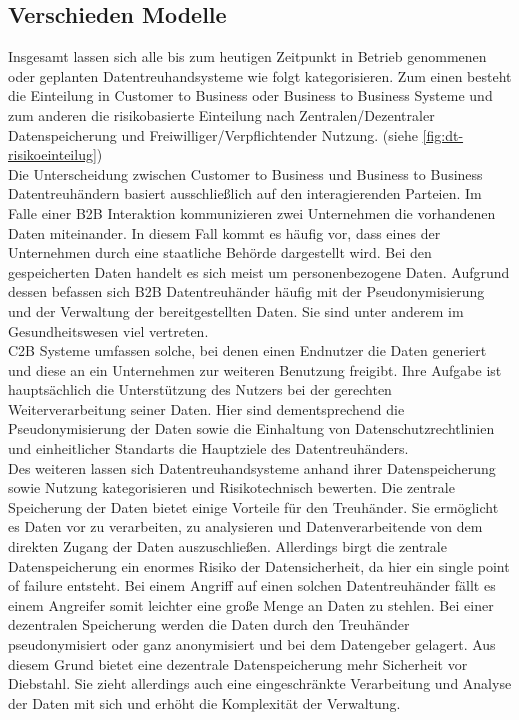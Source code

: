 \documentclass[11pt,a4paper]{scrreprt}
\begin{document}
\subsection{Verschieden Modelle}
Insgesamt lassen sich alle bis zum heutigen Zeitpunkt in Betrieb genommenen oder geplanten Datentreuhandsysteme wie folgt kategorisieren. Zum einen besteht die Einteilung in Customer to Business oder Business to Business Systeme und zum anderen die risikobasierte Einteilung nach Zentralen/Dezentraler Datenspeicherung und Freiwilliger/Verpflichtender Nutzung. (siehe \ref{fig:dt-risikoeinteilug})\\

Die Unterscheidung zwischen Customer to Business und Business to Business Datentreuhändern basiert ausschließlich auf den interagierenden Parteien. Im Falle einer B2B Interaktion kommunizieren zwei Unternehmen die vorhandenen Daten miteinander. In diesem Fall kommt es häufig vor, dass eines der Unternehmen durch eine staatliche Behörde dargestellt wird. Bei den gespeicherten Daten handelt es sich meist um personenbezogene Daten. Aufgrund dessen befassen sich B2B Datentreuhänder häufig mit der Pseudonymisierung und der Verwaltung der bereitgestellten Daten. Sie sind unter anderem im Gesundheitswesen viel vertreten. \cite{dt-blankertz2020datentreuhandmodelle} \\
C2B Systeme umfassen solche, bei denen einen Endnutzer die Daten generiert  und diese an ein Unternehmen zur weiteren Benutzung freigibt. Ihre Aufgabe ist hauptsächlich die Unterstützung des Nutzers bei der gerechten Weiterverarbeitung seiner Daten. \cite{dt-blankertz2020datentreuhandmodelle} Hier sind dementsprechend die Pseudonymisierung der Daten sowie die Einhaltung von Datenschutzrechtlinien und einheitlicher Standarts die Hauptziele des Datentreuhänders.\\

Des weiteren lassen sich Datentreuhandsysteme anhand ihrer Datenspeicherung sowie Nutzung kategorisieren und Risikotechnisch bewerten. 
Die zentrale Speicherung der Daten bietet einige Vorteile für den Treuhänder. Sie ermöglicht es Daten vor zu verarbeiten, zu analysieren und Datenverarbeitende von dem direkten Zugang der Daten auszuschließen. Allerdings birgt die zentrale Datenspeicherung ein enormes Risiko der Datensicherheit, da hier ein single point of failure entsteht. Bei einem Angriff auf einen solchen Datentreuhänder fällt es einem Angreifer somit leichter eine große Menge an Daten zu stehlen.
Bei einer dezentralen Speicherung werden die Daten durch den Treuhänder pseudonymisiert oder ganz anonymisiert und bei dem Datengeber gelagert. Aus diesem Grund bietet eine dezentrale Datenspeicherung mehr Sicherheit vor Diebstahl. Sie zieht allerdings auch eine eingeschränkte Verarbeitung und Analyse der Daten mit sich und erhöht die Komplexität der Verwaltung.\\
\end{document}
